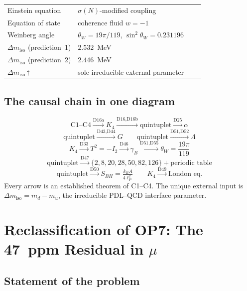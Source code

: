 \documentclass[12pt,a4paper]{article}
\newenvironment{chainbox}[1][]{%
  \begin{tcolorbox}[chainstyle,title={#1}]}{\end{tcolorbox}}
\theoremstyle{definition}
\newcommand{\PDL}{\textsc{PDL}}
\newcommand{\thetaW}{\theta_W}
\newcommand{\sinW}{\sin^2\!\thetaW}
\newcommand{\Dmiso}{\Delta m_{\mathrm{iso}}}
\begin{document}
\begin{longtable}{lp{7.5cm}lp{2cm}}
Einstein equation & $\sigma(N)$-modified coupling & \cite{PDL_D35} \\[0.3em]
Equation of state & coherence fluid $w = -1$ & \cite{PDL_D54} \\[0.3em]
Weinberg angle & $\thetaW = 19\pi/119$, $\sinW = 0.231196$ & \cite{PDL_D55} \\[0.3em]
$\Dmiso$ (prediction~1) & $2.532$~MeV & \cite{PDL_D30} \\[0.3em]
$\Dmiso$ (prediction~2) & $2.446$~MeV & \cite{PDL_D55} \\[0.3em]
$\Dmiso$\,$\dagger$ & sole irreducible external parameter & \cite{PDL_D30} \\[0.3em]
\end{longtable}

\subsection{The causal chain in one diagram}

\begin{chainbox}[Causal chain C1--C4 $\to$ fundamental constants (D55)]
\[
\mathrm{C1\text{--}C4}
\xrightarrow{\text{D16a}} K_4
\xrightarrow{\text{D16,D16b}} \text{quintuplet}
\xrightarrow{\text{D25}} \alpha
\]
\[
\text{quintuplet}
\xrightarrow{\text{D43,D44}} G
\qquad
\text{quintuplet}
\xrightarrow{\text{D51,D52}} \Lambda
\]
\[
K_4 \xrightarrow{\text{D33}} T^2=-I_2
\xrightarrow{\text{D46}} \gamma_B
\xrightarrow{\text{D51,D55}} \thetaW = \frac{19\pi}{119}
\]
\[
\text{quintuplet} \xrightarrow{\text{D47}} \{2,8,20,28,50,82,126\} + \text{periodic table}
\]
\[
\text{quintuplet} \xrightarrow{\text{D50}} S_{BH} = \tfrac{k_B A}{4\ell_P^2}
\qquad
K_4 \xrightarrow{\text{D49}} \text{London eq.}
\]
Every arrow is an established theorem of C1--C4. The unique external input is $\Dmiso = m_d - m_u$, the irreducible \PDL--QCD interface parameter.
\end{chainbox}

\section{Reclassification of OP7: The 47~ppm Residual in \texorpdfstring{$\mu$}{mu}}
\label{sec:op7}

\subsection{Statement of the problem}
\end{document}
